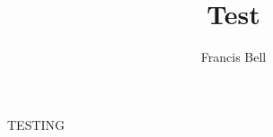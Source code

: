 \documentclass[12pt]{article}
\author{Francis Bell}
\title{Test}
\begin{document}
\maketitle

TESTING
\end{document}
